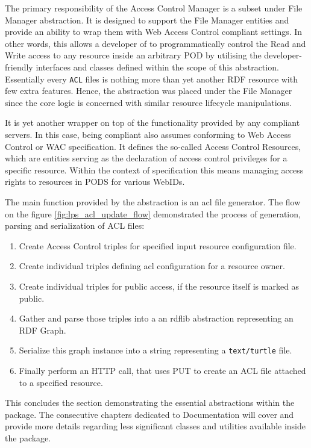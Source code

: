The primary responsibility of the Access Control Manager is a subset under File Manager abstraction. It is designed to support the File Manager entities and provide an ability to wrap them with Web Access Control compliant settings. In other words, this allows a developer of \lpa{} to programmatically control the Read and Write access to any resource inside an arbitrary \solid{} POD by utilising the developer-friendly interfaces and classes defined within the scope of this abstraction. Essentially every \texttt{ACL} files is nothing more than yet another RDF resource with few extra features. Hence, the abstraction was placed under the File Manager since the core logic is concerned with similar resource lifecycle manipulations.

It is yet another wrapper on top of the functionality provided by any \solid{} compliant servers. In this case, being \solid{} compliant also assumes conforming to Web Access Control or WAC specification. It defines the so-called Access Control Resources, which are entities serving as the declaration of access control privileges for a specific resource. Within the context of \solid{} specification this means managing access rights to resources in \solid{} PODS for various WebIDs.

The main function provided by the abstraction is an acl file generator. The flow on the figure \ref{fig:lps_acl_update_flow} demonstrated the process of generation, parsing and serialization of ACL files: 

\begin{enumerate}
	\item Create Access Control triples for specified input resource configuration file.
	\item Create individual triples defining acl configuration for a resource owner.
	\item Create individual triples for public access, if the resource itself is marked as public.
	\item Gather and parse those triples into a an rdflib abstraction representing an RDF Graph.
	\item Serialize this graph instance into a string representing a \texttt{text/turtle} file.
	\item Finally perform an HTTP call, that uses PUT to create an ACL file attached to a specified resource.
\end{enumerate}

This concludes the section demonstrating the essential abstractions within the \lpas{} package. The consecutive chapters dedicated to Documentation will cover and provide more details regarding less significant classes and utilities available inside the package.

